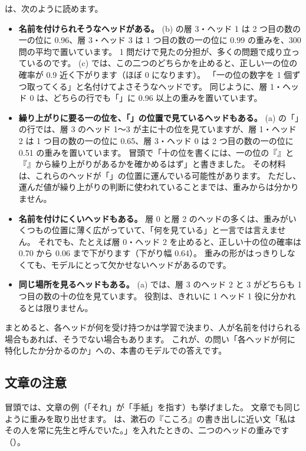 は、次のように読めます。
\begin{itemize}
\item \textbf{名前を付けられそうなヘッドがある。}
(b) の層 3・ヘッド 1 は 2 つ目の数の一の位に 0.96、層 3・ヘッド 3 は 1 つ目の数の一の位に 0.99 の重みを、300 問の平均で置いています。
1 問だけで見たの分担が、多くの問題で成り立っているのです。
(c) では、この二つのどちらかを止めると、正しい一の位の確率が 0.9 近く下がります（ほぼ 0 になります）。
「一の位の数字を 1 個ずつ取ってくる」と名付けてよさそうなヘッドです。
同じように、層 1・ヘッド 0 は、どちらの行でも「\code{=}」に 0.96 以上の重みを置いています。
\item \textbf{繰り上がりに要る一の位を、「\code{=}」の位置で見ているヘッドもある。}
(a) の「\code{=}」の行では、層 3 のヘッド 1〜3 が主に十の位を見ていますが、層 1・ヘッド 2 は 1 つ目の数の一の位に 0.65、層 3・ヘッド 0 は 2 つ目の数の一の位に 0.51 の重みを置いています。
冒頭で「十の位を書くには、一の位の『』と『』から繰り上がりがあるかを確かめるはず」と書きました。
その材料は、これらのヘッドが「\code{=}」の位置に運んでいる可能性があります。
ただし、運んだ値が繰り上がりの判断に使われていることまでは、重みからは分かりません。
\item \textbf{名前を付けにくいヘッドもある。}
層 0 と層 2 のヘッドの多くは、重みがいくつもの位置に薄く広がっていて、「何を見ている」と一言では言えません。
それでも、たとえば層 0・ヘッド 2 を止めると、正しい十の位の確率は 0.70 から 0.06 まで下がります（下がり幅 0.64）。
重みの形がはっきりしなくても、モデルにとって欠かせないヘッドがあるのです。
\item \textbf{同じ場所を見るヘッドもある。}
(a) では、層 3 のヘッド 2 と 3 がどちらも 1 つ目の数の十の位を見ています。
役割は、きれいに 1 ヘッド 1 役に分かれるとは限りません。
\end{itemize}
まとめると、各ヘッドが何を受け持つかは学習で決まり、人が名前を付けられる場合もあれば、そうでない場合もあります。
これが、の問い「各ヘッドが何に特化したか分かるのか」への、本書のモデルでの答えです。

\subsection*{文章の注意}

冒頭では、文章の例（「それ」が「手紙」を指す）も挙げました。
文章でも同じように重みを取り出せます。
は、漱石の『こころ』の書き出しに近い文「私はその人を常に先生と呼んでいた。」を入れたときの、二つのヘッドの重みです（）。

